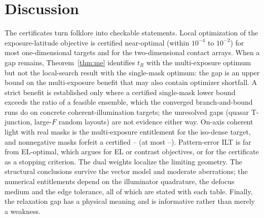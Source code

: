 \documentclass[11pt,a4paper]{article}
\theoremstyle{remark}\newtheorem*{remark}{Remark}
\begin{document}
\section{Discussion}
The certificates turn folklore into checkable statements. Local optimization of the exposure-latitude objective is certified near-optimal (within $10^{-4}$ to $10^{-2}$) for most one-dimensional targets and for the two-dimensional contact arrays. When a gap remains, Theorem~\ref{thm:me} identifies $t_R$ with the multi-exposure optimum but not the local-search result with the single-mask optimum: the gap is an upper bound on the multi-exposure benefit that may also contain optimizer shortfall. A strict benefit is established only where a certified single-mask lower bound exceeds the ratio of a feasible ensemble, which the converged branch-and-bound runs do on concrete coherent-illumination targets; the unresolved gaps (quasar T-junction, large-$F$ random layouts) are not evidence either way. On-axis coherent light with real masks is the multi-exposure entitlement for the iso-dense target, and nonnegative masks forfeit a certified \binPenLo--\binPenHi{} (at most \binPenHiLo--\binPenHiHi). Pattern-error ILT is far from EL-optimal, which argues for EL or contrast objectives, or for the certificate as a stopping criterion. The dual weights localize the limiting geometry. The structural conclusions survive the vector model and moderate aberrations; the numerical entitlements depend on the illuminator quadrature, the defocus medium and the edge tolerance, all of which are stated with each table. Finally, the relaxation gap has a physical meaning and is informative rather than merely a weakness.
\end{document}
